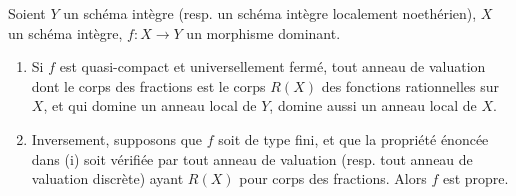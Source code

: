 \begin{corollary}[7.3.10]
\label{II.7.3.10-fr}
Soient $Y$ un schéma intègre \textup{(resp.} un schéma intègre localement noethérien),
$X$ un schéma intègre, $f:X\to Y$ un morphisme dominant.
\begin{enumerate}
\item[\rm (i)] Si $f$ est quasi-compact et universellement fermé, tout anneau
de valuation dont le corps des fractions est le corps $R(X)$ des fonctions
rationnelles sur $X$, et qui domine un anneau local de $Y$, domine aussi un
anneau local de $X$.
\item[\rm (ii)] Inversement, supposons que $f$ soit de type fini, et que la
propriété énoncée dans \textup{(i)} soit vérifiée par tout anneau de valuation \textup{(resp.}
tout anneau de valuation discrète) ayant $R(X)$ pour corps des fractions.
Alors $f$ est propre.
\end{enumerate}
\end{corollary}

